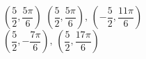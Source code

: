 { $\left( \dfrac{5}{2}, \dfrac{5\pi}{6} \right)$}
{$\left( \dfrac{5}{2}, \dfrac{5\pi}{6} \right), \, \left( -\dfrac{5}{2}, \dfrac{11\pi}{6} \right)$\\$\left( \dfrac{5}{2}, -\dfrac{7\pi}{6} \right), \, \left( \dfrac{5}{2}, \dfrac{17\pi}{6} \right)$\\ }
